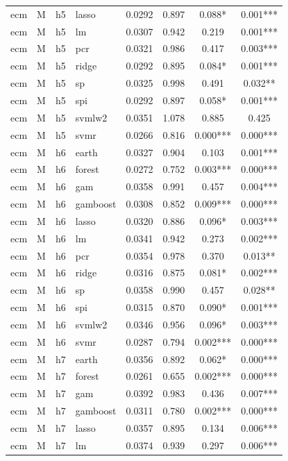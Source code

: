 \begin{ThreePartTable}
\begin{longtable}[t]{llclcccc}
ecm & M & h5 & lasso & 0.0292 & 0.897 & 0.088* & 0.001***\\
ecm & M & h5 & lm & 0.0307 & 0.942 & 0.219 & 0.001***\\
ecm & M & h5 & pcr & 0.0321 & 0.986 & 0.417 & 0.003***\\
ecm & M & h5 & ridge & 0.0292 & 0.895 & 0.084* & 0.001***\\
ecm & M & h5 & sp & 0.0325 & 0.998 & 0.491 & 0.032**\\
ecm & M & h5 & spi & 0.0292 & 0.897 & 0.058* & 0.001***\\
ecm & M & h5 & svmlw2 & 0.0351 & 1.078 & 0.885 & 0.425\\
ecm & M & h5 & svmr & 0.0266 & 0.816 & 0.000*** & 0.000***\\
\addlinespace
ecm & M & h6 & earth & 0.0327 & 0.904 & 0.103 & 0.001***\\
ecm & M & h6 & forest & 0.0272 & 0.752 & 0.003*** & 0.000***\\
ecm & M & h6 & gam & 0.0358 & 0.991 & 0.457 & 0.004***\\
ecm & M & h6 & gamboost & 0.0308 & 0.852 & 0.009*** & 0.000***\\
ecm & M & h6 & lasso & 0.0320 & 0.886 & 0.096* & 0.003***\\
ecm & M & h6 & lm & 0.0341 & 0.942 & 0.273 & 0.002***\\
ecm & M & h6 & pcr & 0.0354 & 0.978 & 0.370 & 0.013**\\
ecm & M & h6 & ridge & 0.0316 & 0.875 & 0.081* & 0.002***\\
ecm & M & h6 & sp & 0.0358 & 0.990 & 0.457 & 0.028**\\
ecm & M & h6 & spi & 0.0315 & 0.870 & 0.090* & 0.001***\\
ecm & M & h6 & svmlw2 & 0.0346 & 0.956 & 0.096* & 0.003***\\
ecm & M & h6 & svmr & 0.0287 & 0.794 & 0.002*** & 0.000***\\
\addlinespace
ecm & M & h7 & earth & 0.0356 & 0.892 & 0.062* & 0.000***\\
ecm & M & h7 & forest & 0.0261 & 0.655 & 0.002*** & 0.000***\\
ecm & M & h7 & gam & 0.0392 & 0.983 & 0.436 & 0.007***\\
ecm & M & h7 & gamboost & 0.0311 & 0.780 & 0.002*** & 0.000***\\
ecm & M & h7 & lasso & 0.0357 & 0.895 & 0.134 & 0.006***\\
ecm & M & h7 & lm & 0.0374 & 0.939 & 0.297 & 0.006***\\

\end{longtable}
\end{ThreePartTable}
